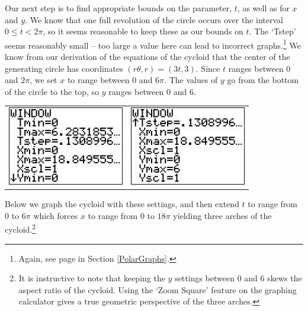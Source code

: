 \documentclass{ximera}
\begin{document}
Our next step is to find appropriate bounds on the parameter, $t$, as well as for $x$ and $y$.   We know that one full revolution of the circle occurs over the interval $0 \leq t < 2\pi$, so it seems reasonable to keep these as our bounds on $t$.  The `Tstep' seems reasonably small -- too large a value here can lead to incorrect graphs.\footnote{Again, see page \pageref{polargraphscalculator} in Section \ref{PolarGraphs}.}  We know from our derivation of the equations of the cycloid that the center of the generating circle has coordinates $(r\theta,r)  = (3t,3)$.  Since  $t$ ranges between $0$ and $2\pi$, we set $x$ to range between $0$ and $6\pi$.  The values of $y$ go from the bottom of the circle to the top, so $y$ ranges between $0$ and $6$.

\begin{center}
\begin{tabular}{cc}

\includegraphics[width=2in]{./ParametricEquationsGraphics/Parametric03.jpg} &
\hspace{0.75in} \includegraphics[width=2in]{./ParametricEquationsGraphics/Parametric04.jpg} \\

\end{tabular} 


\end{center}

Below we graph the cycloid with these settings, and then extend $t$ to range from $0$ to $6\pi$ which forces $x$ to range from $0$ to $18\pi$ yielding three arches of the cycloid.\footnote{It is instructive to note that keeping the $y$ settings between 0 and 6 skews the aspect ratio of the cycloid.  Using the `Zoom Square' feature on the graphing calculator gives a true geometric perspective of the three arches.}
\end{document}
